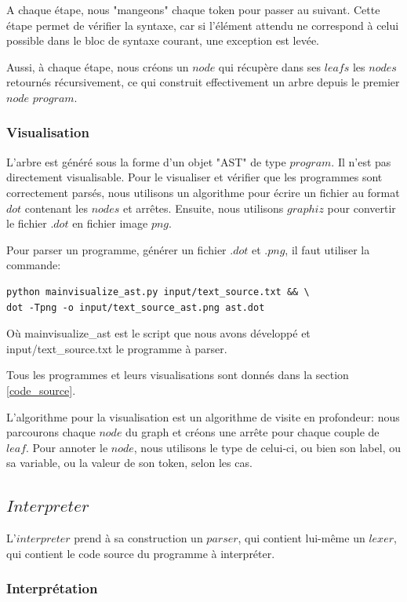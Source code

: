 \documentclass[a4paper]{article}
\begin{document}
A chaque étape, nous "mangeons" chaque token pour passer au suivant. Cette étape permet de vérifier la syntaxe, car si l'élément attendu ne correspond à celui possible dans le bloc de syntaxe courant, une exception est levée. 

Aussi, à chaque étape, nous créons un $node$ qui récupère dans ses $leafs$ les $nodes$ retournés récursivement, ce qui construit effectivement un arbre depuis le premier $node$ $program$. 

\subsubsection{Visualisation}

L'arbre est généré sous la forme d'un objet "AST" de type $program$. Il n'est pas directement visualisable. Pour le visualiser et vérifier que les programmes sont correctement parsés, nous utilisons un algorithme pour écrire un fichier au format $dot$ contenant les $nodes$ et arrêtes. Ensuite, nous utilisons $graphiz$ pour convertir le fichier $.dot$ en fichier image $png$. 

Pour parser un programme, générer un fichier $.dot$ et $.png$, il faut utiliser la commande: 
\begin{verbatim}
python mainvisualize_ast.py input/text_source.txt && \
dot -Tpng -o input/text_source_ast.png ast.dot
\end{verbatim}

Où mainvisualize\_ast est le script que nous avons développé et input/text\_source.txt le programme à parser. 

Tous les programmes et leurs visualisations sont donnés dans la section \ref{code_source}.

L’algorithme pour la visualisation est un algorithme de visite en profondeur: nous parcourons chaque $node$ du graph et créons une arrête pour chaque couple de $leaf$. Pour annoter le $node$, nous utilisons le type de celui-ci, ou bien son label, ou sa variable, ou la valeur de son token, selon les cas.  

\subsection{$Interpreter$}

L'$interpreter$ prend à sa construction un $parser$, qui contient lui-même un $lexer$, qui contient le code source du programme à interpréter. 

\subsubsection{Interprétation}
\end{document}
